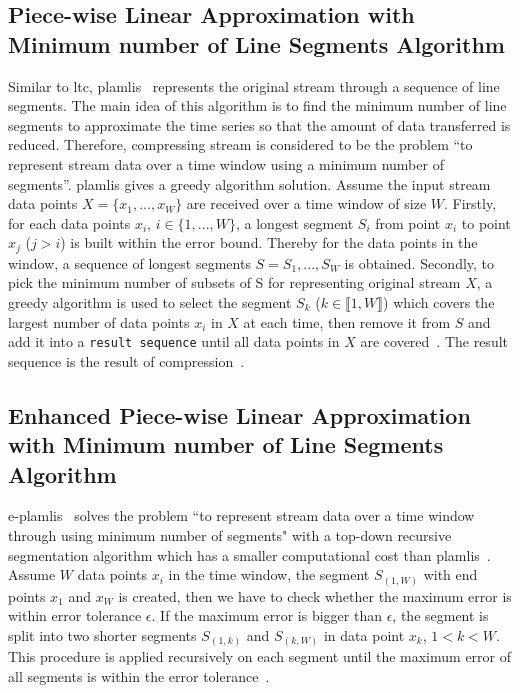 \subsection{Piece-wise Linear Approximation
with Minimum number of Line Segments Algorithm}

Similar to \acrshort{ltc}, \acrfull{plamlis}~\cite{liu2007energy} represents the
original stream through a sequence of line segments. The main idea of this
algorithm is to find the minimum number of line segments to approximate the time
series so that the amount of data transferred is reduced. Therefore, compressing
stream is considered to be the problem ``to represent stream data over a time
window using a minimum number of segments''. \acrshort{plamlis} gives a greedy
algorithm solution. Assume the input stream data points $X=\{x_1, ..., x_W\}$
are received over a time window of size $W$. Firstly, for each data points
$x_i$, $i \in \{1, ..., W\}$, a longest segment $S_{i}$ from point $x_i$ to
point $x_j$ ($j>i$) is built within the error bound. Thereby for the data points
in the window, a sequence of longest segments $S = {S_1, ..., S_W}$ is obtained.
Secondly, to pick the minimum number of subsets of S for representing original
stream $X$, a greedy algorithm is used to select the segment $S_k$ ($k \in
\llbracket1, W\rrbracket$) which covers the largest number of data points $x_i$
in $X$ at each time, then remove it from $S$ and add it into a \texttt{result
sequence} until all data points in $X$ are covered~\cite{liu2007energy}. The
result sequence is the result of compression~\cite{zordan2012compress,
zordan2014performance}.


\subsection{Enhanced Piece-wise Linear Approximation with Minimum number of Line
Segments Algorithm}
\acrfull{e-plamlis}~\cite{pham2008enhance} solves the problem ``to represent
stream data over a time window through using minimum number of segments" with a
top-down recursive segmentation algorithm which has a smaller computational cost
than \acrshort{plamlis}~\cite{pham2008enhance, zordan2014performance}. Assume
$W$ data points $x_i$ in the time window, the segment $S_{(1, W)}$ with end
points $x_1$ and $x_W$ is created, then we have to check whether the maximum
error is within error tolerance $\epsilon$. If the maximum error is bigger than
$\epsilon$, the segment is split into two shorter segments $S_{(1, k)}$ and
$S_{(k, W)}$ in data point $x_k$, $1<k<W$. This procedure is applied recursively
on each segment until the maximum error of all segments is within the error
tolerance~\cite{pham2008enhance, zordan2014performance}.


